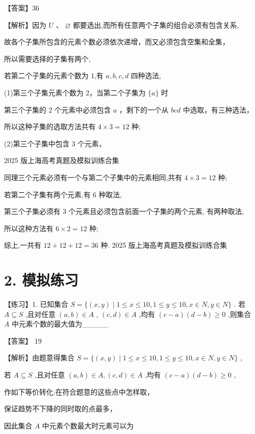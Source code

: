 \documentclass[10pt]{article}
\begin{document}
【答案】36

【解析】因为 \(U\text{ 、 }\varnothing\) 都要选出,而所有任意两个子集的组合必须有包含关系,

故各个子集所包含的元素个数必须依次递增，而又必须包含空集和全集，

所以需要选择的子集有两个,

若第二个子集的元素个数为 1,有 \(a,b,c,d\) 四种选法,

(1)第三个子集元素个数为 2，当第二个子集为 \(\{ a\}\) 时

第三个子集的 2 个元素中必须包含 \(a\) ，剩下的一个从 \({bcd}\) 中选取，有三种选法，

所以这种子集的选取方法共有 \(4 \times  3 = {12}\) 种;

(2)第三个子集中包含 3 个元素，

2025 版上海高考真题及模拟训练合集

同理三个元素必须有一个与第二个子集中的元素相同,共有 \(4 \times  3 = {12}\) 种;

若第二个子集有两个元素,有 6 种取法,

第三个子集必须有 3 个元素且必须包含前面一个子集的两个元素, 有两种取法,

所以这种方法有 \(6 \times  2 = {12}\) 种;

综上,一共有 \({12} + {12} + {12} = {36}\) 种. 2025 版上海高考真题及模拟训练合集

\section*{2. 模拟练习}

【练习】1. 已知集合 \(S = \{ \left( {x,y}\right)  \mid  1 \leq  x \leq  {10},1 \leq  y \leq  {10},x \in  N,y \in  N\}\) . 若 \(A \subseteq  S\) ,且对任意 \(\left( {a,b}\right)  \in  A\) , \(\left( {c,d}\right)  \in  A\) ,均有 \(\left( {c - a}\right) \left( {d - b}\right)  \geq  0\) ,则集合 \(A\) 中元素个数的最大值为\_\_\_\_\_

【答案】 19

【解析】由题意得集合 \(S = \{ \left( {x,y}\right)  \mid  1 \leq  x \leq  {10},1 \leq  y \leq  {10},x \in  N,y \in  N\}\) ,

若 \(A \subseteq  S\) ,且对任意 \(\left( {a,b}\right)  \in  A,\left( {c,d}\right)  \in  A\) ,均有 \(\left( {c - a}\right) \left( {d - b}\right)  \geq  0\) ,

作如下等价转化:在符合题意的这些点中怎样取，

保证趋势不下降的同时取的点最多，

因此集合 \(A\) 中元素个数最大时元素可以为
\end{document}

